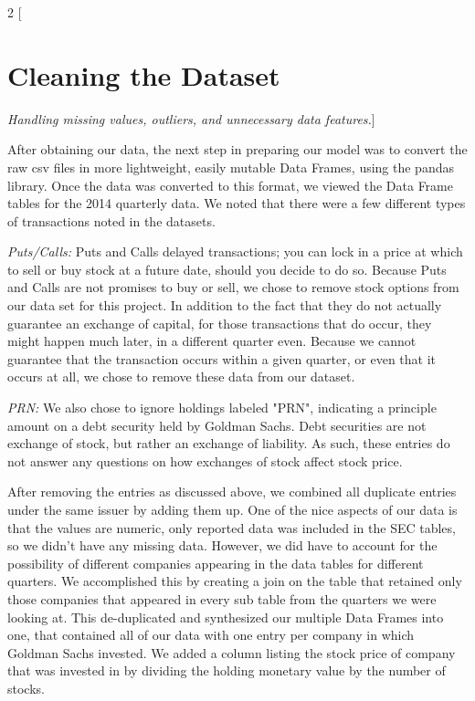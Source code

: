 \documentclass{article}
\begin{document}
\begin{multicols}{2}
[\section*{Cleaning the Dataset} \textit{Handling missing values, outliers, and unnecessary data features.}]

After obtaining our data, the next step in preparing our model was to convert the raw csv files in more lightweight, easily mutable Data Frames, using the pandas library. Once the data was converted to this format, we viewed the Data Frame tables for the 2014 quarterly data. We noted that there were a few different types of transactions noted in the datasets. 

\textit{Puts/Calls:}
Puts and Calls delayed transactions; you can lock in a price at which to sell or buy stock at a future date, should you decide to do so. Because Puts and Calls are not promises to buy or sell, we chose to remove stock options from our data set for this project. In addition to the fact that they do not actually guarantee an exchange of capital, for those transactions that do occur, they might happen much later, in a different quarter even. Because we cannot guarantee that the transaction occurs within a given quarter, or even that it occurs at all, we chose to remove these data from our dataset.

\textit{PRN:}
We also chose to ignore holdings labeled "PRN", indicating a principle amount on a debt security held by Goldman Sachs. Debt securities are not exchange of stock, but rather an exchange of liability. As such, these entries do not answer any questions on how exchanges of stock affect stock price. 

After removing the entries as discussed above, we combined all duplicate entries under the same issuer by adding them up.  One of the nice aspects of our data is that the values are numeric, only reported data was included in the SEC tables, so we didn't have any missing data. However, we did have to account for the possibility of different companies appearing in the data tables for different quarters. We accomplished this by creating a join on the table that retained only those companies that appeared in every sub table from the quarters we were looking at. This de-duplicated and synthesized our multiple Data Frames into one, that contained all of our data with one entry per company in which Goldman Sachs invested. We added a column listing the stock price of company that was invested in by dividing the holding monetary value by the number of stocks. 


\end{multicols}
\end{document}
